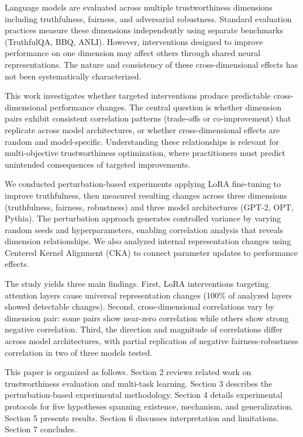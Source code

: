 
Language models are evaluated across multiple trustworthiness dimensions including truthfulness, fairness, and adversarial robustness. Standard evaluation practices measure these dimensions independently using separate benchmarks (TruthfulQA, BBQ, ANLI). However, interventions designed to improve performance on one dimension may affect others through shared neural representations. The nature and consistency of these cross-dimensional effects has not been systematically characterized.

This work investigates whether targeted interventions produce predictable cross-dimensional performance changes. The central question is whether dimension pairs exhibit consistent correlation patterns (trade-offs or co-improvement) that replicate across model architectures, or whether cross-dimensional effects are random and model-specific. Understanding these relationships is relevant for multi-objective trustworthiness optimization, where practitioners must predict unintended consequences of targeted improvements.

We conducted perturbation-based experiments applying LoRA fine-tuning to improve truthfulness, then measured resulting changes across three dimensions (truthfulness, fairness, robustness) and three model architectures (GPT-2, OPT, Pythia). The perturbation approach generates controlled variance by varying random seeds and hyperparameters, enabling correlation analysis that reveals dimension relationships. We also analyzed internal representation changes using Centered Kernel Alignment (CKA) to connect parameter updates to performance effects.

The study yields three main findings. First, LoRA interventions targeting attention layers cause universal representation changes (100\% of analyzed layers showed detectable changes). Second, cross-dimensional correlations vary by dimension pair: some pairs show near-zero correlation while others show strong negative correlation. Third, the direction and magnitude of correlations differ across model architectures, with partial replication of negative fairness-robustness correlation in two of three models tested.

This paper is organized as follows. Section 2 reviews related work on trustworthiness evaluation and multi-task learning. Section 3 describes the perturbation-based experimental methodology. Section 4 details experimental protocols for five hypotheses spanning existence, mechanism, and generalization. Section 5 presents results. Section 6 discusses interpretation and limitations. Section 7 concludes.
